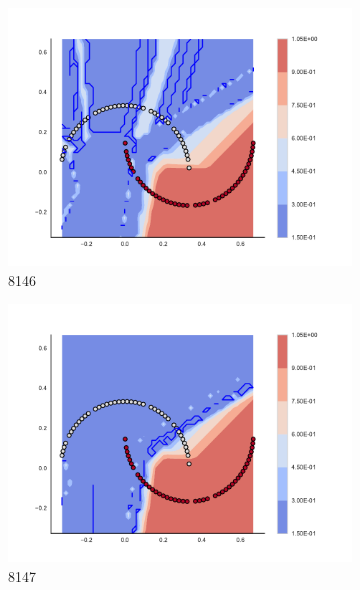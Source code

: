 \begin{figure}[h]
\begin{subfigure}[b]{0.09\textwidth}
    \includegraphics[clip, trim=2.35cm 1.75cm 4.5cm 0cm,width=\textwidth]{img/convergence/8146.pdf}
    \caption{8146}
    \label{fig:convergence_8146}
\end{subfigure}
%
\begin{subfigure}[b]{0.09\textwidth}
    \includegraphics[clip, trim=2.35cm 1.75cm 4.5cm 0cm,width=\textwidth]{img/convergence/8147.pdf}
    \caption{8147}
    \label{fig:convergence_8147}
\end{subfigure}
%
\begin{subfigure}[b]{0.09\textwidth}

\end{subfigure}
\end{figure}
